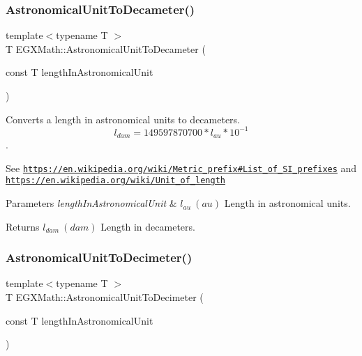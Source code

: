 \subsubsection{\texorpdfstring{Astronomical\+Unit\+To\+Decameter()}{AstronomicalUnitToDecameter()}}
{\footnotesize\ttfamily template$<$typename T $>$ \\
T E\+G\+X\+Math\+::\+Astronomical\+Unit\+To\+Decameter (\begin{DoxyParamCaption}\item[{const T}]{length\+In\+Astronomical\+Unit }\end{DoxyParamCaption})}



Converts a length in astronomical units to decameters. \[ l_{dam}=149597870700 * l_{au} * 10^{-1} \]. 

See \href{https://en.wikipedia.org/wiki/Metric_prefix#List_of_SI_prefixes}{\tt https\+://en.\+wikipedia.\+org/wiki/\+Metric\+\_\+prefix\#\+List\+\_\+of\+\_\+\+S\+I\+\_\+prefixes} and \href{https://en.wikipedia.org/wiki/Unit_of_length}{\tt https\+://en.\+wikipedia.\+org/wiki/\+Unit\+\_\+of\+\_\+length} 
\begin{DoxyParams}{Parameters}
{\em length\+In\+Astronomical\+Unit} & $ l_{au}\ (au)$ Length in astronomical units. \\
\hline
\end{DoxyParams}
\begin{DoxyReturn}{Returns}
$ l_{dam}\ (dam)$ Length in decameters. 
\end{DoxyReturn}
\mbox{\label{group___e_g_x_math-_conversions-_length_conversions-_astronomical-_astronomical_unit-_s_i_gab6dc67694d65c0f62ac3e4d750c5ed6e}} 
\subsubsection{\texorpdfstring{Astronomical\+Unit\+To\+Decimeter()}{AstronomicalUnitToDecimeter()}}
{\footnotesize\ttfamily template$<$typename T $>$ \\
T E\+G\+X\+Math\+::\+Astronomical\+Unit\+To\+Decimeter (\begin{DoxyParamCaption}\item[{const T}]{length\+In\+Astronomical\+Unit }\end{DoxyParamCaption})}



